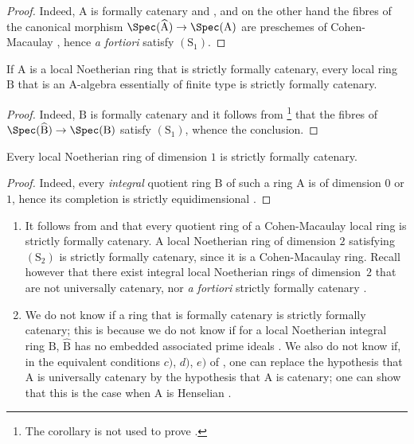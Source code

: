 \begin{proof}
Indeed, $\mathrm{A}$ is formally catenary  and , and on the other hand the fibres of the canonical morphism $\Spec(\widehat{\mathrm{A}})\to\Spec(\mathrm{A})$ are preschemes of Cohen-Macaulay , hence \emph{a fortiori} satisfy $(\mathrm{S}_1)$.
\end{proof}

\begin{corollary}[7.2.8]
\label{IV.7.2.8}
If $\mathrm{A}$ is a local Noetherian ring that is strictly formally catenary, every local ring $\mathrm{B}$ that is an A-algebra essentially of finite type is strictly formally catenary.
\end{corollary}

\begin{proof}
Indeed, $\mathrm{B}$ is formally catenary  and it follows from \footnote{The corollary  is not used to prove .} that the fibres of $\Spec(\widehat{\mathrm{B}})\to\Spec(\mathrm{B})$ satisfy $(\mathrm{S}_1)$, whence the conclusion.
\end{proof}

\begin{corollary}[7.2.9]
\label{IV.7.2.9}
Every local Noetherian ring of dimension $1$ is strictly formally catenary.
\end{corollary}

\begin{proof}
Indeed, every \emph{integral} quotient ring $\mathrm{B}$ of such a ring $\mathrm{A}$ is of dimension $0$ or $1$, hence its completion is strictly equidimensional .
\end{proof}

\begin{remarks}[7.2.10]
\label{IV.7.2.10}
\begin{enumerate}[label=\emph{\roman*)}]
  \item It follows from  and  that every quotient ring of a Cohen-Macaulay local ring is strictly formally catenary.
  A local Noetherian ring of dimension $2$ satisfying $(\mathrm{S}_2)$ is strictly formally catenary, since it is a Cohen-Macaulay ring.
  Recall however that there exist integral local Noetherian rings of dimension~$2$ that are not universally catenary, nor \emph{a fortiori} strictly formally catenary .

  \item We do not know if a ring that is formally catenary  is strictly formally catenary; this is because we do not know if for a local Noetherian integral ring $\mathrm{B}$, $\widehat{\mathrm{B}}$ has no embedded associated prime ideals .
  We also do not know if, in the equivalent conditions $c)$, $d)$, $e)$ of , one can replace the hypothesis that $\mathrm{A}$ is universally catenary by the hypothesis that $\mathrm{A}$ is catenary; one can show that this is the case when $\mathrm{A}$ is Henselian .
\end{enumerate}
\end{remarks}


